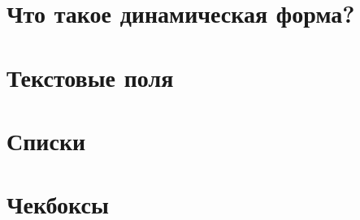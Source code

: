 \documentclass[../index.tex]{subfiles}
\begin{document}
\section{Что такое динамическая форма?}
	
\section{Текстовые поля}

\section{Списки}

\section{Чекбоксы}
\end{document}
